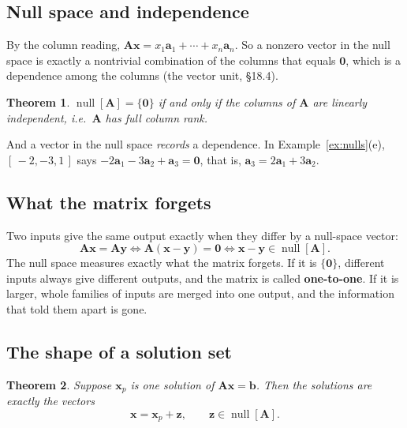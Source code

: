 \documentclass[11pt]{article}
\theoremstyle{plain}
\newtheorem{thm}{Theorem}[section]
\theoremstyle{definition}
\theoremstyle{remark}
\newcommand{\vc}[1]{\mathbf{#1}}
\newcommand{\mt}[1]{\mathbf{#1}}
\newcommand{\nullsp}[1]{\operatorname{null}[#1]}
\begin{document}
\subsection{Null space and independence}
By the column reading,
$\mt{A}\vc{x}=x_1\vc{a}_1+\cdots+x_n\vc{a}_n$. So a nonzero vector in the null
space is exactly a nontrivial combination of the columns that equals $\vc{0}$,
which is a dependence among the columns (the vector unit, \S18.4).

\begin{thm}
\label{thm:nullindep}
$\nullsp{\mt{A}}=\{\vc{0}\}$ if and only if the columns of $\mt{A}$ are linearly
independent, i.e.\ $\mt{A}$ has full column rank.
\end{thm}

\noindent And a vector in the null space \emph{records} a dependence. In
Example~\ref{ex:nulls}(e), $[\,-2,-3,1\,]$ says
$-2\vc{a}_1-3\vc{a}_2+\vc{a}_3=\vc{0}$, that is, $\vc{a}_3=2\vc{a}_1+3\vc{a}_2$.

\subsection{What the matrix forgets}
Two inputs give the same output exactly when they differ by a null-space vector:
\[
  \mt{A}\vc{x}=\mt{A}\vc{y}
  \iff \mt{A}(\vc{x}-\vc{y})=\vc{0}
  \iff \vc{x}-\vc{y}\in\nullsp{\mt{A}} .
\]
The null space measures exactly what the matrix forgets. If it is $\{\vc{0}\}$,
different inputs always give different outputs, and the matrix is called
\textbf{one-to-one}. If it is larger, whole families of inputs are merged into
one output, and the information that told them apart is gone.

\subsection{The shape of a solution set}
\begin{thm}
\label{thm:solset}
Suppose $\vc{x}_p$ is one solution of $\mt{A}\vc{x}=\vc{b}$. Then the solutions
are exactly the vectors
\[
  \vc{x}=\vc{x}_p+\vc{z},\qquad \vc{z}\in\nullsp{\mt{A}} .
\]
\end{thm}
\end{document}
